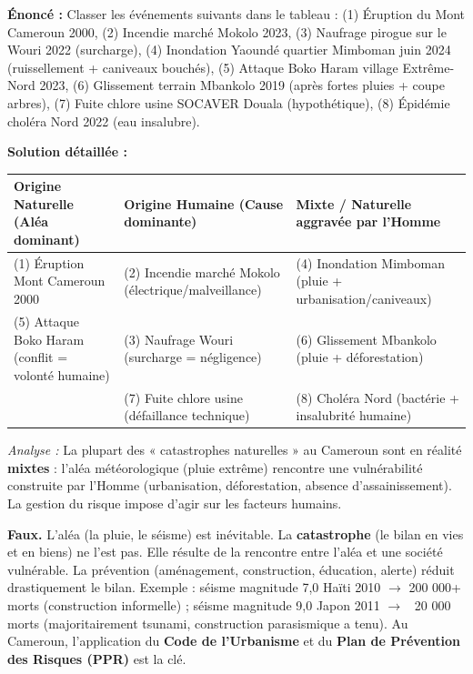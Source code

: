 \documentclass[11pt]{article}
\begin{document}
\begin{exoresolu}
\textbf{Énoncé :} Classer les événements suivants dans le tableau : (1) Éruption du Mont Cameroun 2000, (2) Incendie marché Mokolo 2023, (3) Naufrage pirogue sur le Wouri 2022 (surcharge), (4) Inondation Yaoundé quartier Mimboman juin 2024 (ruissellement + caniveaux bouchés), (5) Attaque Boko Haram village Extrême-Nord 2023, (6) Glissement terrain Mbankolo 2019 (après fortes pluies + coupe arbres), (7) Fuite chlore usine SOCAVER Douala (hypothétique), (8) Épidémie choléra Nord 2022 (eau insalubre).

\textbf{Solution détaillée :}
\begin{center}
\begin{tabular}{|l|l|l|}\hline
\textbf{Origine Naturelle (Aléa dominant)} & \textbf{Origine Humaine (Cause dominante)} & \textbf{Mixte / Naturelle aggravée par l'Homme} \\ \hline
(1) Éruption Mont Cameroun 2000 & (2) Incendie marché Mokolo (électrique/malveillance) & (4) Inondation Mimboman (pluie + urbanisation/caniveaux) \\
(5) Attaque Boko Haram (conflit = volonté humaine) & (3) Naufrage Wouri (surcharge = négligence) & (6) Glissement Mbankolo (pluie + déforestation) \\
& (7) Fuite chlore usine (défaillance technique) & (8) Choléra Nord (bactérie + insalubrité humaine) \\
\hline
\end{tabular}
\end{center}
\emph{Analyse :} La plupart des « catastrophes naturelles » au Cameroun sont en réalité \textbf{mixtes} : l'aléa météorologique (pluie extrême) rencontre une vulnérabilité construite par l'Homme (urbanisation, déforestation, absence d'assainissement). La gestion du risque impose d'agir sur les facteurs humains.
\end{exoresolu}

\begin{attention}
\textbf{Faux.} L'aléa (la pluie, le séisme) est inévitable. La \textbf{catastrophe} (le bilan en vies et en biens) ne l'est pas. Elle résulte de la rencontre entre l'aléa et une société vulnérable. La prévention (aménagement, construction, éducation, alerte) réduit drastiquement le bilan. Exemple : séisme magnitude 7,0 Haïti 2010 $\rightarrow$ 200 000+ morts (construction informelle) ; séisme magnitude 9,0 Japon 2011 $\rightarrow$ ~20 000 morts (majoritairement tsunami, construction parasismique a tenu). Au Cameroun, l'application du \textbf{Code de l'Urbanisme} et du \textbf{Plan de Prévention des Risques (PPR)} est la clé.
\end{attention}
\end{document}
